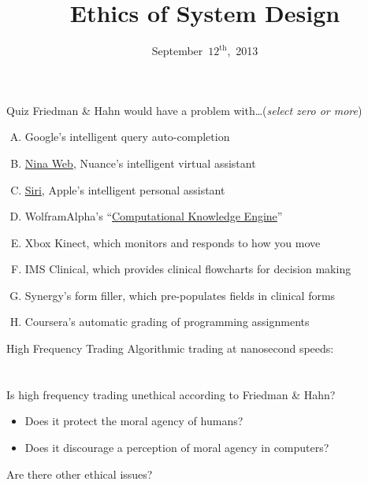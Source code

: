 \documentclass{beamer}
\title{Ethics of System Design}
\date{September~$12^{\text{th}}$,~2013}
\begin{document}
\begin{frame}
\titlepage
\end{frame}

\begin{frame}{Quiz}
Friedman \& Hahn would have a problem with\ldots \hfill (\emph{select zero or more})
\begin{enumerate}[(A)]
\item<1> Google's intelligent query auto-completion
\item<1-2> \href{http://www.youtube.com/watch?v=5Y6DjWw_Td8}{Nina Web}, Nuance's intelligent virtual assistant
\item<1-2> \href{http://www.youtube.com/watch?v=rNsrl86inpo}{Siri}, Apple's intelligent personal assistant
\item<1-2> WolframAlpha's ``\href{http://www.wolframalpha.com/}{Computational Knowledge Engine}''
\item<1> Xbox Kinect, which monitors and responds to how you move
\item<1-2> IMS Clinical, which provides clinical flowcharts for decision making
\item<1> Synergy's form filler, which pre-populates fields in clinical forms
\item<1> Coursera's automatic grading of programming assignments
\end{enumerate}
\end{frame}

\begin{frame}{High Frequency Trading}
Algorithmic trading at nanosecond speeds: \\
\href{http://www.colbertnation.com/the-colbert-report-videos/421265/november-14-2012/high-frequency-trading}{} \\
\href{http://www.colbertnation.com/the-colbert-report-videos/421266/november-14-2012/high-frequency-trading---christopher-steiner}{} \\
\bigskip
Is high frequency trading unethical according to Friedman \& Hahn?
\begin{itemize}
\item Does it protect the moral agency of humans?
\item Does it discourage a perception of moral agency in computers?
\end{itemize}
Are there other ethical issues?
\end{frame}
\end{document}
